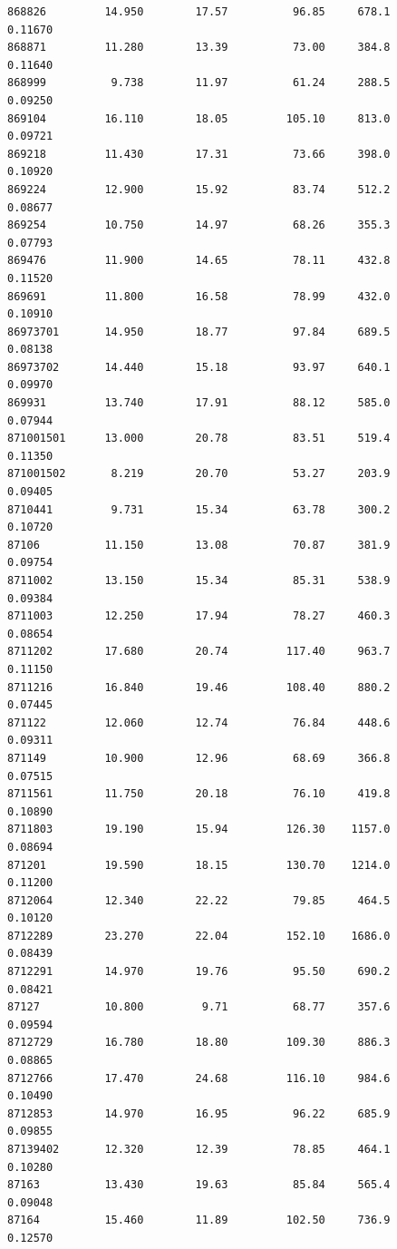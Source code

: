 \documentclass[
  letterpaper,
  DIV=11,
  numbers=noendperiod]{scrartcl}
\begin{document}
\begin{verbatim}
868826         14.950        17.57          96.85     678.1         0.11670
868871         11.280        13.39          73.00     384.8         0.11640
868999          9.738        11.97          61.24     288.5         0.09250
869104         16.110        18.05         105.10     813.0         0.09721
869218         11.430        17.31          73.66     398.0         0.10920
869224         12.900        15.92          83.74     512.2         0.08677
869254         10.750        14.97          68.26     355.3         0.07793
869476         11.900        14.65          78.11     432.8         0.11520
869691         11.800        16.58          78.99     432.0         0.10910
86973701       14.950        18.77          97.84     689.5         0.08138
86973702       14.440        15.18          93.97     640.1         0.09970
869931         13.740        17.91          88.12     585.0         0.07944
871001501      13.000        20.78          83.51     519.4         0.11350
871001502       8.219        20.70          53.27     203.9         0.09405
8710441         9.731        15.34          63.78     300.2         0.10720
87106          11.150        13.08          70.87     381.9         0.09754
8711002        13.150        15.34          85.31     538.9         0.09384
8711003        12.250        17.94          78.27     460.3         0.08654
8711202        17.680        20.74         117.40     963.7         0.11150
8711216        16.840        19.46         108.40     880.2         0.07445
871122         12.060        12.74          76.84     448.6         0.09311
871149         10.900        12.96          68.69     366.8         0.07515
8711561        11.750        20.18          76.10     419.8         0.10890
8711803        19.190        15.94         126.30    1157.0         0.08694
871201         19.590        18.15         130.70    1214.0         0.11200
8712064        12.340        22.22          79.85     464.5         0.10120
8712289        23.270        22.04         152.10    1686.0         0.08439
8712291        14.970        19.76          95.50     690.2         0.08421
87127          10.800         9.71          68.77     357.6         0.09594
8712729        16.780        18.80         109.30     886.3         0.08865
8712766        17.470        24.68         116.10     984.6         0.10490
8712853        14.970        16.95          96.22     685.9         0.09855
87139402       12.320        12.39          78.85     464.1         0.10280
87163          13.430        19.63          85.84     565.4         0.09048
87164          15.460        11.89         102.50     736.9         0.12570

\end{verbatim}
\end{document}
